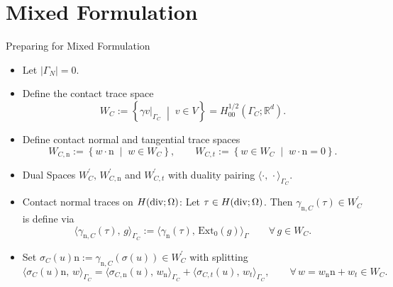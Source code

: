 \documentclass[10pt,aspectratio=169]{beamer}
\def\R{{\mathbb R}}
\newcommand{\diver}{\operatornamewithlimits{div}}
\begin{document}
\section{Mixed Formulation}

\begin{frame}{Preparing for Mixed Formulation}
	\begin{itemize}
		\item Let $|\Gamma_N| = 0$.
		\item Define the contact trace space
		      \begin{equation*}
			      W_C
			      :=
			      \left\{
			      \gamma v|_{\Gamma_C}
			      \;\middle|\;
			      v\in V
			      \right\}
			      =
			      H^{1/2}_{00}(\Gamma_C;\R^d).
		      \end{equation*}
		\item Define contact normal and tangential trace spaces
		      \begin{equation*}
			      W_{C,\mathrm n}
			      :=
			      \left\{
			      w\cdot \mathrm{n}
			      \;\middle|\;
			      w\in W_C
			      \right\},\qquad W_{C,t}
			      :=
			      \left\{
			      w\in W_C
			      \;\middle|\;
			      w\cdot \mathrm{n} = 0
			      \right\}.
		      \end{equation*}
		\item Dual Spaces $W_C^\prime,\, W_{C,\mathrm{n}}^\prime$ and $W_{C,t}^\prime$ with duality pairing $\langle \cdot,\,\cdot\rangle_{\Gamma_C}$.
		\item Contact normal traces on $H(\diver;\Omega)$: Let $\tau\in H(\diver;\Omega)$. Then $\gamma_{\mathrm{n},C}(\tau)\in W^\prime_C$ is define via
		      \begin{equation*}
			      \langle \gamma_{\mathrm n,C}(\tau),\,g\rangle_{\Gamma_C}
			      :=
			      \langle \gamma_{\mathrm n}(\tau),\,\mathrm{Ext}_0(g)\rangle_\Gamma
			      \qquad
			      \forall\, g\in W_C.
		      \end{equation*}
		\item Set $\sigma_C(u)\mathrm{n}:= \gamma_{\mathrm{n},C}(\sigma(u))\in W_C^\prime$ with splitting
		      \begin{equation*}
			      \langle\sigma_C(u)\mathrm{n},\, w\rangle_{\Gamma_C} =\langle \sigma_{C,\mathrm{n}}(u),\, w_\mathrm{n}\rangle_{\Gamma_C}+\langle \sigma_{C,t}(u),\, w_t\rangle_{\Gamma_C},\qquad \forall\, w = w_\mathrm{n}\mathrm{n}+w_t\in W_C.
		      \end{equation*}
	\end{itemize}
\end{frame}
\end{document}
